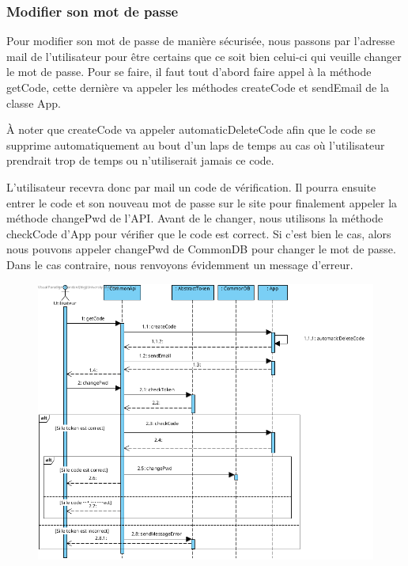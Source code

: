 \newpage
\subsubsection{Modifier son mot de passe}

\begin{flushleft}
Pour modifier son mot de passe de manière sécurisée, nous passons par l'adresse mail de l'utilisateur pour être certains que ce soit bien celui-ci qui veuille changer le mot de passe. Pour se faire, il faut tout d'abord faire appel à la méthode getCode, cette dernière va appeler les méthodes createCode et sendEmail de la classe App.
\end{flushleft}

\begin{flushleft}
À noter que createCode va appeler automaticDeleteCode afin que le code se supprime automatiquement au bout d'un laps de temps au cas où l'utilisateur prendrait trop de temps ou n'utiliserait jamais ce code.
\end{flushleft}

\begin{flushleft}
L'utilisateur recevra donc par mail un code de vérification. Il pourra ensuite entrer le code et son nouveau mot de passe sur le site pour finalement appeler la méthode changePwd de l'API. Avant de le changer, nous utilisons la méthode checkCode d'App pour vérifier que le code est correct. Si c'est bien le cas, alors nous pouvons appeler changePwd de CommonDB pour changer le mot de passe. Dans le cas contraire, nous renvoyons évidemment un message d'erreur.
\end{flushleft}

\begin{figure}[h]
\centering
\includegraphics[height = 0.9\textwidth]{Base/sequence/img/common/Modifier son mot de passe.png}
\end{figure}

